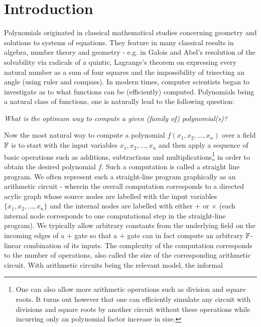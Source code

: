 \section{Introduction}\label{sec:introduction}
Polynomials originated in classical mathematical studies concerning
geometry and solutions to systems of equations. They feature in many
classical results in algebra, number theory and geometry - e.g. in
Galois and Abel's resolution of the solvability via radicals of a
quintic, Lagrange's theorem on expressing every natural number as a
sum of four squares and the impossibility of trisecting an angle
(using ruler and compass). In modern times, computer scientists began
to investigate as to what functions can be (efficiently)
computed. Polynomials being a natural class of functions, one is
naturally lead to the following question:
	\begin{center}
		\begin{minipage}{0.8\textwidth}
			{\em What is the optimum way to compute a given (family of) polynomial(s)?}
		\end{minipage}
	\end{center}
	Now the most natural way to compute a polynomial $f(x_1, x_2, \ldots, x_n) $ 
	over a field $\mathbb{F}$ is to start with the input variables 
	$x_1, x_2, \ldots, x_n$ and then apply a sequence of basic 
	operations such as additions, subtractions and 
	multiplications\footnote{
		One can also allow more arithmetic operations such as division 
		and square roots. It turns out however that one can efficiently 
		simulate any circuit with divisions and square roots by another 
		circuit without these operations while incurring only an 
		polynomial factor increase in size.
	}
	in order to obtain the desired polynomial $f$. Such a computation 
	is called a straight line program. We often represent such a 
	straight-line program graphically as an arithmetic circuit - 
	wherein the overall computation corresponds to a directed acylic 
	graph whose source nodes are labelled with the input variables 
	$\{ x_1, x_2, \ldots, x_n \}$ and the internal nodes are labelled 
	with either $+$ or $\times$ (each internal node corresponds to one 
	computational step in the straight-line program). We typically allow 
	arbitrary constants from the underlying field on the incoming edges 
	of a $+$ gate so that a $+$ gate can in fact compute an arbitrary 
	$\mathbb{F}$-linear combination of its inputs. The complexity of the 
	computation corresponds to the number of operations, also called 
	the size of the corresponding arithmetic circuit.
	With arithmetic circuits being the relevant model, the informal 
